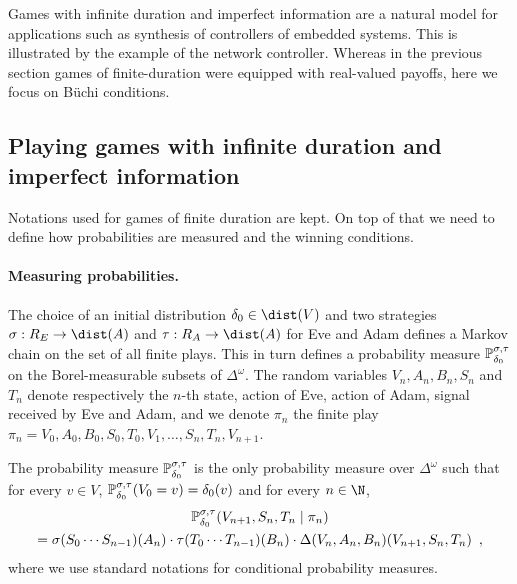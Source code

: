 Games with infinite duration and imperfect information
are a natural model for applications such as synthesis 
of controllers of embedded systems.
This is illustrated by the example of the network controller.
Whereas in the previous section games of finite-duration
were equipped with real-valued payoffs, 
here we focus on B{\"u}chi conditions.


\subsection{Playing games with infinite duration and imperfect information}

Notations used for games of finite duration are kept.
On top of that we need to define how probabilities are measured
and the winning conditions.

\paragraph{Measuring probabilities.}
The choice of an initial distribution
$\ini\in\dist(V)$ 
and two strategies
$\sigma:  R_E \to \dist(A)$
and $\tau:  R_A \to \dist(A)$
for Eve and Adam
defines a Markov chain on the set of all finite plays.
This in turn defines a probability measure
$\mathbb{P}_{\delta_0}^{\sigma,\tau}$ on the Borel-measurable
subsets of $\Delta^\omega$.
The random variables $V_n,A_n,B_n,S_{n}$ and $T_{n}$ denote
respectively the $n$-th state, action of Eve, action of Adam, 
signal received by Eve and Adam,
and we denote $\pi_n$ the finite play 
$\pi_n = V_0,A_0,B_0,S_0,T_0,V_1,\ldots,S_{n},T_{n},V_{n+1}$.

The probability measure $\mathbb{P}_{\delta_0}^{\sigma,\tau}$ is the only
probability measure over $\Delta^\omega$ such that
for every $v\in V$, 
$\mathbb{P}^{\sigma,\tau}_{\delta_0}(V_0 = v) = \delta_0(v)$
and for every $n\in\N$,
\begin{multline*}
\mathbb{P}^{\sigma,\tau}_{\delta_0}(V_{n+1}, S_{n}, T_{n} \mid \pi_n) \\
= \sigma(S_0\cdots S_{n-1})(A_{n}) \cdot \tau(T_0\cdots T_{n-1})(B_n) \cdot \Delta(V_n,A_n,B_n)(V_{n+1},S_{n},T_{n})\enspace,
\end{multline*}
where we use standard notations for conditional probability measures.

